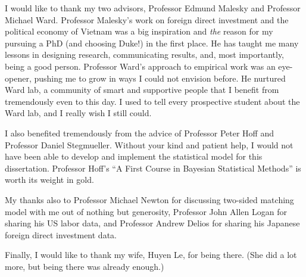 \acknowledgements

I would like to thank my two advisors, Professor Edmund Malesky and Professor
Michael Ward. Professor Malesky's work on foreign direct investment and the
political economy of Vietnam was a big inspiration and \textit{the} reason for my
pursuing a PhD (and choosing Duke!) in the first place. He has taught me many
lessons in designing research, communicating results, and, most importantly,
being a good person. Professor Ward's approach to empirical work was an
eye-opener, pushing me to grow in ways I could not envision before. He nurtured
Ward lab, a community of smart and supportive people that I benefit from
tremendously even to this day. I used to tell every prospective student about
the Ward lab, and I really wish I still could.

I also benefited tremendously from the advice of Professor Peter Hoff and Professor Daniel Stegmueller. Without your kind and patient help, I would not have been able to develop and implement the statistical model for this dissertation. Professor Hoff's ``A First Course in Bayesian Statistical Methods'' is worth its weight in gold.

My thanks also to Professor Michael Newton for discussing two-sided matching model with me out of nothing but generosity, Professor John Allen Logan for sharing his US labor data, and Professor Andrew Delios for sharing his Japanese foreign direct investment data.

Finally, I would like to thank my wife, Huyen Le, for being there. (She did a lot more, but being there was already enough.)

